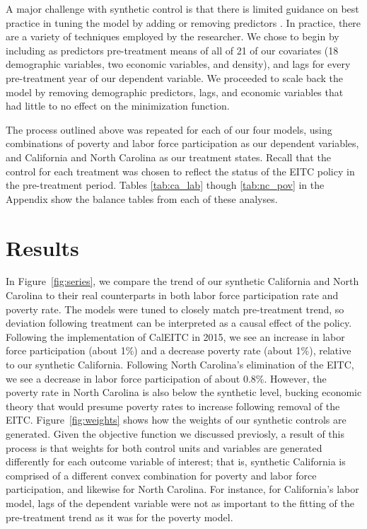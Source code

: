 \documentclass{article}
\begin{document}
A major challenge with synthetic control is that there is limited guidance on best practice in tuning the model by adding or removing predictors \citep{ferman2020cherry}. In practice, there are a variety of techniques employed by the researcher. We chose to begin by including as predictors pre-treatment means of all of 21 of our covariates (18 demographic variables, two economic variables, and density), and lags for every pre-treatment year of our dependent variable. We proceeded to scale back the model by removing demographic predictors, lags, and economic variables that had little to no effect on the minimization function. 

The process outlined above was repeated for each of our four models, using combinations of poverty and labor force participation as our dependent variables, and California and North Carolina as our treatment states. Recall that the control for each treatment was chosen to reflect the status of the EITC policy in the pre-treatment period. Tables \ref{tab:ca_lab} though \ref{tab:nc_pov} in the Appendix show the balance tables from each of these analyses.


\section{Results}

In Figure~\ref{fig:series}, we compare the trend of our synthetic California and North Carolina to their real counterparts in both labor force participation rate and poverty rate. The models were tuned to closely match pre-treatment trend, so deviation following treatment can be interpreted as a causal effect of the policy. Following the implementation of CalEITC in 2015, we see an increase in labor force participation (about 1\%) and a decrease poverty rate (about 1\%), relative to our synthetic California. Following North Carolina's elimination of the EITC, we see a decrease in labor force participation of about 0.8\%. However, the poverty rate in North Carolina is also below the synthetic level, bucking economic theory that would presume poverty rates to increase following removal of the EITC. Figure~\ref{fig:weights} shows how the weights of our synthetic controls are generated. Given the objective function we discussed previosly, a result of this process is that weights for both control units and variables are generated differently for each outcome variable of interest; that is, synthetic California is comprised of a different convex combination for poverty and labor force participation, and likewise for North Carolina. For instance, for California's labor model, lags of the dependent variable were not as important to the fitting of the pre-treatment trend as it was for the poverty model. 
\end{document}

